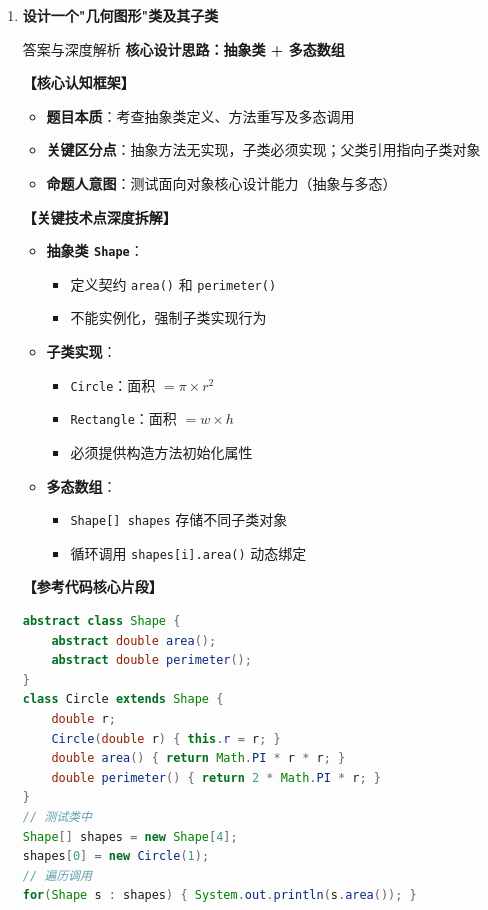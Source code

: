 \documentclass[12pt, a4paper]{ctexart}
\newcommand{\code}[1]{\texttt{#1}}
\begin{document}
\begin{enumerate}[label=\textbf{\arabic*.}, leftmargin=*, itemsep=1.5em]
\item \textbf{设计一个"几何图形"类及其子类}
\begin{bluebox}{答案与深度解析}
\textbf{核心设计思路：抽象类 + 多态数组}

\textbf{【核心认知框架】}
\begin{itemize}[leftmargin=*, nosep]
    \item \textbf{题目本质}：考查抽象类定义、方法重写及多态调用
    \item \textbf{关键区分点}：抽象方法无实现，子类必须实现；父类引用指向子类对象
    \item \textbf{命题人意图}：测试面向对象核心设计能力（抽象与多态）
\end{itemize}

\textbf{【关键技术点深度拆解】}
\begin{itemize}[leftmargin=*, nosep]
    \item \textbf{抽象类 \code{Shape}}：
    \begin{itemize}
        \item 定义契约 \code{area()} 和 \code{perimeter()}
        \item 不能实例化，强制子类实现行为
    \end{itemize}
    \item \textbf{子类实现}：
		\begin{itemize}
			\item \code{Circle}：面积 $= \pi \times r^2$
			\item \code{Rectangle}：面积 $= w \times h$
			\item 必须提供构造方法初始化属性
		\end{itemize}
    \item \textbf{多态数组}：
    \begin{itemize}
        \item \code{Shape[] shapes} 存储不同子类对象
        \item 循环调用 \code{shapes[i].area()} 动态绑定
    \end{itemize}
\end{itemize}

\textbf{【参考代码核心片段】}
\begin{lstlisting}[language=Java]
abstract class Shape {
    abstract double area();
    abstract double perimeter();
}
class Circle extends Shape {
    double r;
    Circle(double r) { this.r = r; }
    double area() { return Math.PI * r * r; }
    double perimeter() { return 2 * Math.PI * r; }
}
// 测试类中
Shape[] shapes = new Shape[4];
shapes[0] = new Circle(1);
// 遍历调用
for(Shape s : shapes) { System.out.println(s.area()); }
\end{lstlisting}
\end{bluebox}


\end{enumerate}
\end{document}
